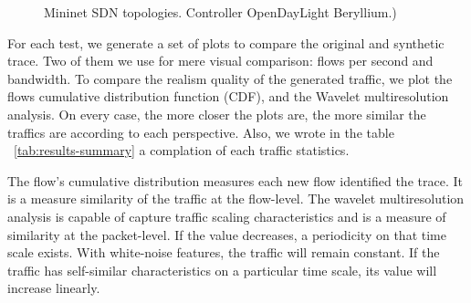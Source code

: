 \begin{figure}[h!]
	\centering
	\hspace{0mm}
	\hspace{0mm}
	\caption{Mininet SDN topologies. Controller OpenDayLight Beryllium.)}
	\label{fig:topo}
\end{figure}


For each test, we generate a set of plots to compare the original and synthetic trace. Two of them we use for mere visual comparison: flows per second and bandwidth. To compare the realism quality of the generated traffic, we plot the flows cumulative distribution function (CDF)\cite{harpoon-paper}, and the Wavelet multiresolution analysis.  On every case, the more closer the plots are, the more similar the traffics are according to each perspective. Also, we wrote in the table ~\ref{tab:results-summary} a complation of each traffic statistics. 

The flow's cumulative distribution measures each new flow identified the trace. It is a measure similarity of the traffic at the flow-level.  The wavelet multiresolution analysis is capable of capture traffic scaling characteristics and is a measure of similarity at the packet-level. If the value decreases, a periodicity on that time scale exists. With white-noise features, the traffic will remain constant. If the traffic has self-similar characteristics on a particular time scale, its value will increase linearly.

